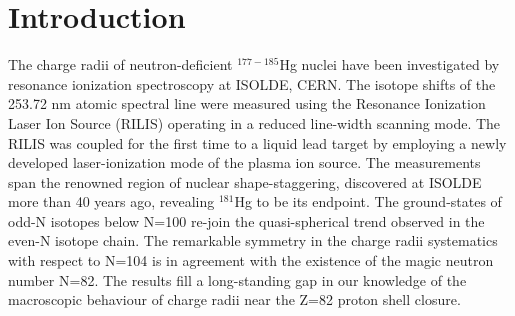 \section{Introduction}
The charge radii of neutron-deficient $^{177-185}$Hg nuclei have been investigated by resonance ionization spectroscopy at ISOLDE, CERN.  The isotope shifts of the 253.72 nm atomic spectral line were measured using the Resonance Ionization Laser Ion Source (RILIS) operating in a reduced line-width scanning mode.  The RILIS was coupled for the first time to a liquid lead target by employing a newly developed laser-ionization mode of the plasma ion source. The measurements span the renowned region of nuclear shape-staggering, discovered at ISOLDE more than 40 years ago, revealing $^{181}$Hg to be its endpoint. The ground-states of odd-N isotopes below N=100 re-join the quasi-spherical trend observed in the even-N isotope chain.  The remarkable symmetry in the charge radii systematics with respect to N=104 is in agreement with the existence of the magic neutron number N=82. The results fill a long-standing gap in our knowledge of the macroscopic behaviour of charge radii near the Z=82 proton shell closure.